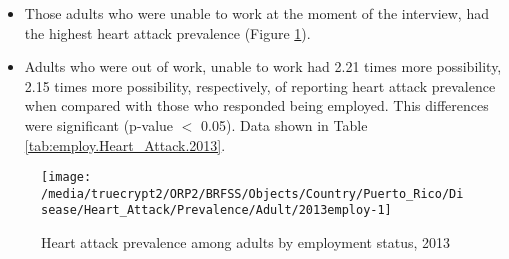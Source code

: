  
 \newpage
\begin{itemize}


\item Those adults who were 
unable to work at the moment of the interview, had the highest heart attack prevalence (Figure \ref{fig:employ.Heart_Attack.2013}).

\item Adults who were out of work, unable to work had 2.21 times more possibility, 2.15 times more possibility, respectively, of reporting heart attack prevalence when compared with those who responded being employed. This differences were significant (p-value $<$ 0.05). 
Data shown in Table \ref{tab:employ.Heart_Attack.2013}.


\end{itemize}

\begin{figure}[H]
\caption{Heart attack prevalence among adults by employment status, 
         2013}
\label{fig:employ.Heart_Attack.2013}
\begin{knitrout}
\color{fgcolor}

{\centering \texttt{[image: /media/truecrypt2/ORP2/BRFSS/Objects/Country/Puerto\_Rico/Disease/Heart\_Attack/Prevalence/Adult/2013employ-1]} 

}



\end{knitrout}
 \end{figure}

